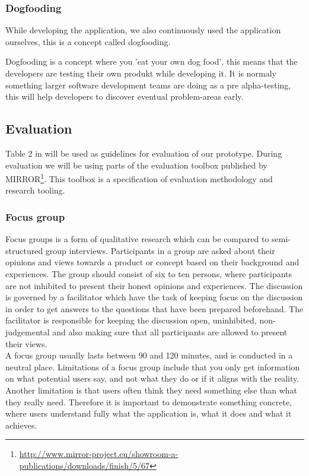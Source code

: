 \subsubsection*{Dogfooding}
While developing the application, we also continuously used the application ourselves, this is a concept called dogfooding.

Dogfooding is a concept where you 'eat your own dog food', this means that the developers are testing their own produkt while developing it\cite{dogfooding}. It is normaly something larger software development teams are doing as a pre alpha-testing, this will help developers to discover eventual problem-areas early.

\subsection{Evaluation}
Table 2 in \cite{Esearch2004} will be used as guidelines for evaluation of our prototype. 
During evaluation we will be using parts of the evaluation toolbox published by MIRROR\footnote{\url{http://www.mirror-project.eu/showroom-a-publications/downloads/finish/5/67}}. This toolbox is a specification of evaluation methodology and research tooling. 

\subsubsection{Focus group}
Focus groups is a form of qualitative research which can be compared to semi-structured group interviews\cite{rogers2011interaction}. Participants in a group are asked about their opinions and views towards a product or concept based on their background and experiences\cite{krueger2008focus}. The group should consist of six to ten persons, where participants are not inhibited to present their honest opinions and experiences\cite{krueger2008focus}. The discussion is governed by a facilitator which have the task of keeping focus on the discussion in order to get answers to the questions that have been prepared beforehand\cite{krueger2008focus, nielsen1997use}. The facilitator is responsible for keeping the discussion open, uninhibited, non-judgemental and also making sure that all participants are allowed to present their views\cite{powell1996focus}. \\
A focus group usually lasts between 90 and 120 minutes, and is conducted in a neutral place. Limitations of a focus group include that you only get information on what potential users say, and not what they do or if it aligns with the reality\cite{nielsen1997use}. Another limitation is that users often think they need something else than what they really need. Therefore it is important to demonstrate something concrete, where users understand fully what the application is, what it does and what it achieves. 
 
